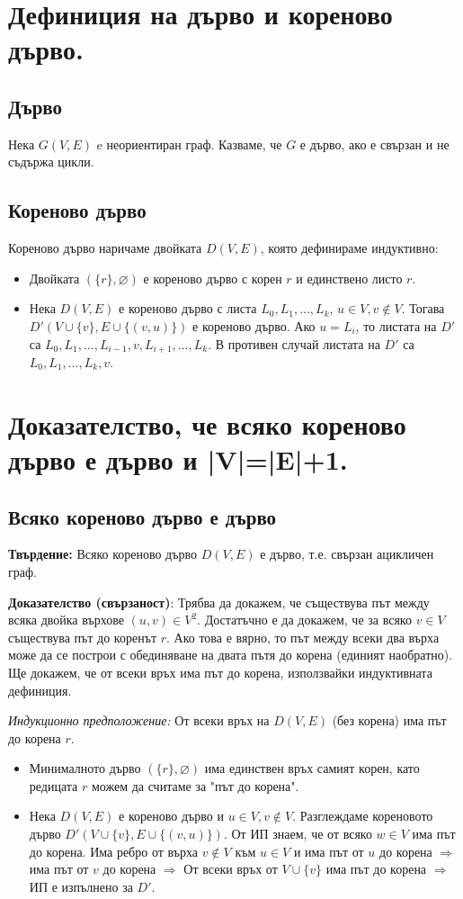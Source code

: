 \documentclass[fleqn,12pt]{article}
\begin{document}
\begin{flushleft}
\section{Дефиниция на дърво и кореново дърво.}

\subsection{Дърво}
Нека $G(V, E)$ e неориентиран граф. Казваме, че $G$ е дърво, ако е свързан и не съдържа цикли.

\subsection{Кореново дърво}
Кореново дърво наричаме двойката $D(V, E)$, която дефинираме индуктивно:
\begin{itemize}
	\item Двойката $(\{r\}, \varnothing)$ е кореново дърво с корен $r$ и единствено листо $r$.
	\item Нека $D(V,E)$ е кореново дърво с листа $L_0, L_1, \dots, L_k$, $u \in V, v \notin V$. Тогава $D'(V \cup \{v\}, E \cup \{ (v, u)\})$ е кореново дърво.
	Ако $u = L_i$, то листата на $D'$ са $L_0, L_1, \dots, L_{i-1}, v, L_{i+1}, \dots, L_k$. В противен случай листата на $D'$ са 
	$L_0, L_1, \dots, L_k, v$.
\end{itemize}

\section{Доказателство, че всяко кореново дърво е дърво и |V|=|E|+1.}
\subsection{Всяко кореново дърво е дърво}
\textbf{Твърдение:} Всяко кореново дърво $D(V,E)$ е дърво, т.е. свързан ацикличен граф.

\textbf{Доказателство (свързаност)}: Трябва да докажем, че съществува път между всяка двойка върхове $(u, v) \in V^2$. Достатъчно е да докажем, че 
за всяко $v \in V$ съществува път до коренът $r$. Ако това е вярно, то път между всеки два върха може да се построи с обединяване на двата пътя до корена 
(единият наобратно). Ще докажем, че от всеки връх има път до корена, използвайки индуктивната дефиниция.

\textit{Индукционно предположение:} От всеки връх на $D(V,E)$ (без корена) има път до корена $r$. 
\begin{itemize}
	\item Минималното дърво $(\{r\}, \varnothing)$ има единствен връх самият корен, като редицата $r$ можем да считаме за "път до корена".
	\item Нека $D(V,E)$ е кореново дърво и $u \in V, v \notin V$. Разглеждаме кореновото дърво $D'(V \cup \{v\}, E \cup \{ (v, u)\})$.
	От ИП знаем, че от всяко $w \in V$ има път до корена. Има ребро от върха $v \notin V$ към $u \in V$ и има път от $u$ до корена $\Rightarrow$
	има път от $v$ до корена $\Rightarrow$ От всеки връх от $V \cup \{v\}$ има път до корена $\Rightarrow$ ИП е изпълнено за $D'$.
\end{itemize}


\end{flushleft}
\end{document}
